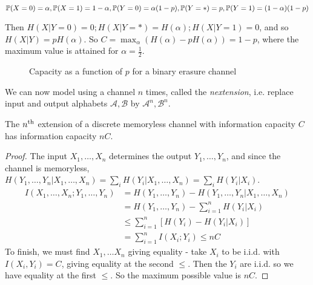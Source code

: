 \documentclass[10pt,a4paper]{article}
\begin{document}
$\P(X=0) = \alpha, \P(X=1) = 1-\alpha, \P(Y = 0) = \alpha(1-p), \P(Y=\ast) = p, \P(Y=1) =(1-\alpha)(1-p)$

Then $H(X|Y=0) = 0; H(X|Y = \ast) = H(\alpha); H(X|Y = 1) = 0$, and so $H(X|Y) = pH(\alpha)$. So $C = \max_\alpha (H(\alpha) - pH(\alpha)) = 1-p$, where the maximum value is attained for $\alpha =\frac12$.
\begin{figure}[H]
\centering
{}
\caption{Capacity as a function of $p$ for a binary erasure channel}
\end{figure}

We can now model using a channel $n$ times, called the \emph{n\th extension}, i.e. replace input and output alphabets $\mathscr{A}, \mathscr{B}$ by $\mathscr{A}^n, \mathscr{B}^n$.

\begin{lemma}
The $n\th$ extension of a discrete memoryless channel with information capacity $C$ has information capacity $nC$.
\end{lemma}
\begin{proof}
The input $X_1, \ldots, X_n$ determines the output $Y_1, \ldots, Y_n$, and since the channel is memoryless, $H(Y_1,\ldots,Y_n|X_1,\ldots,X_n) = \sum_i H(Y_i|X_1, \ldots, X_n) = \sum_i H(Y_i|X_i)$.
\begin{align*}
I(X_1, \ldots, X_n; Y_1, \ldots, Y_n) &= H(Y_1, \ldots, Y_n) - H(Y_1, \ldots, Y_n|X_1, \ldots, X_n)\\
&= H(Y_1, \ldots, Y_n) - \sum_{i=1}^n H(Y_i|X_i)\\
&\leq \sum_{i=1}^n \left[ H(Y_i) - H(Y_i|X_i)\right]\\
&= \sum_{i=1}^n I(X_i; Y_i) \leq nC
\end{align*}
To finish, we must find $X_1, \ldots X_n$ giving equality - take $X_i$ to be i.i.d. with $I(X_i, Y_i) = C$, giving equality at the second $\leq$. Then the $Y_i$ are i.i.d. so we have equality at the first $\leq$. So the maximum possible value is $nC$.
\end{proof}
\end{document}
